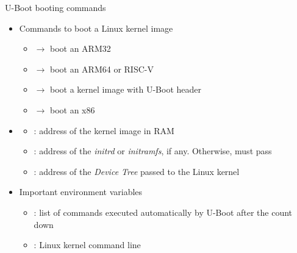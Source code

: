 \begin{frame}{U-Boot booting commands}
  \begin{itemize}
  \item Commands to boot a Linux kernel image
    \begin{itemize}
    \item {} $\rightarrow$ boot an ARM32 
    \item {} $\rightarrow$ boot an ARM64 or RISC-V 
    \item {} $\rightarrow$ boot a kernel image with U-Boot header
    \item {} $\rightarrow$ boot an x86 
    \end{itemize}
  \item {}
    \begin{itemize}
    \item {}: address of the kernel image in RAM
    \item {}: address of the {\em initrd} or {\em initramfs}, if any. Otherwise, must pass \code{-}
    \item {}: address of the {\em Device Tree} passed to the Linux kernel
    \end{itemize}
  \item Important environment variables
    \begin{itemize}
    \item {}: list of commands executed automatically by
      U-Boot after the count down
    \item {}: Linux kernel command line
    \end{itemize}
  \end{itemize}
\end{frame}

